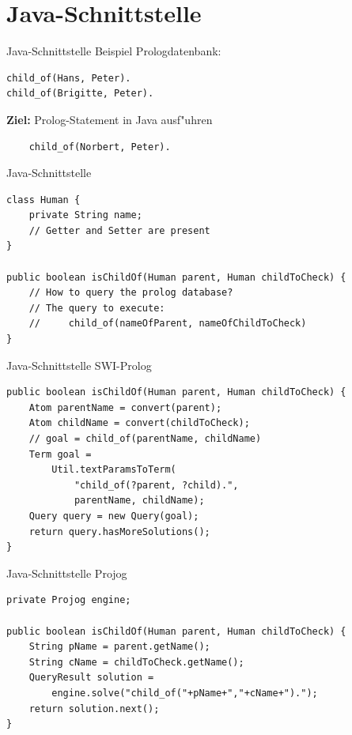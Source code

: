 \documentclass[18pt]{beamer}
\begin{document}
\section{Java-Schnittstelle}
\begin{frame}[fragile]{Java-Schnittstelle}
Beispiel Prologdatenbank:
\begin{verbatim}
child_of(Hans, Peter).
child_of(Brigitte, Peter).
\end{verbatim}
\vspace{1cm}
\textbf{Ziel:} Prolog-Statement in Java ausf"uhren
\begin{verbatim}
    child_of(Norbert, Peter).
\end{verbatim}
\end{frame}
\begin{frame}[fragile]{Java-Schnittstelle}
\begin{verbatim}
class Human {
	private String name;
	// Getter and Setter are present
}

public boolean isChildOf(Human parent, Human childToCheck) {
	// How to query the prolog database?
	// The query to execute:
	//     child_of(nameOfParent, nameOfChildToCheck)
}
\end{verbatim}
\end{frame}
\begin{frame}[fragile]{Java-Schnittstelle SWI-Prolog}
\begin{verbatim}
public boolean isChildOf(Human parent, Human childToCheck) {
    Atom parentName = convert(parent);
    Atom childName = convert(childToCheck);
    // goal = child_of(parentName, childName)
    Term goal = 
        Util.textParamsToTerm(
            "child_of(?parent, ?child).", 
            parentName, childName);
    Query query = new Query(goal);
    return query.hasMoreSolutions();
}
\end{verbatim}
\end{frame}
\begin{frame}[fragile]{Java-Schnittstelle Projog}
\begin{verbatim}
private Projog engine;

public boolean isChildOf(Human parent, Human childToCheck) {
    String pName = parent.getName();
    String cName = childToCheck.getName();
    QueryResult solution =
        engine.solve("child_of("+pName+","+cName+").");
    return solution.next();
}
\end{verbatim}
\end{frame}
\end{document}
